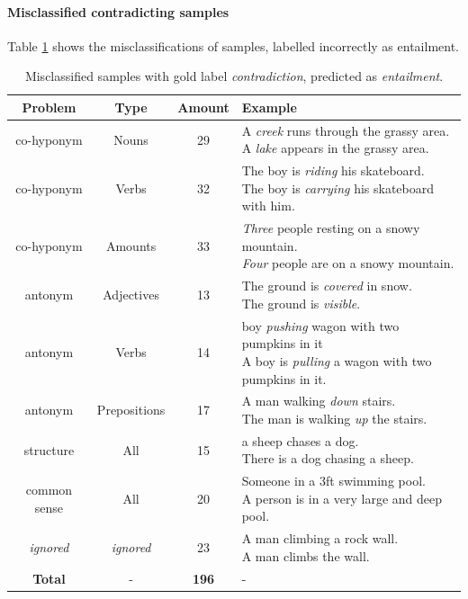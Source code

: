 \paragraph*{Misclassified contradicting samples}
Table \ref{tab:misclassified_orig_contr} shows the misclassifications of samples, labelled incorrectly as entailment.
\begin{table}[tph!]
\centering
\begin{tabular}{cccl}
\textbf{Problem} & \textbf{Type} & \textbf{Amount} & \textbf{Example} \\
\toprule
co-hyponym & Nouns & 29 & \specialcell{A \textit{creek} runs through the grassy area.\\A \textit{lake} appears in the grassy area.}\\
co-hyponym & Verbs & 32 & \specialcell{The boy is \textit{riding} his skateboard.\\The boy is \textit{carrying} his skateboard with him.}\\
co-hyponym & Amounts & 33 & \specialcell{\textit{Three} people resting on a snowy mountain.\\\textit{Four} people are on a snowy mountain.}\\
antonym & Adjectives & 13 & \specialcell{The ground is \textit{covered} in snow.\\The ground is \textit{visible}.}\\
antonym & Verbs & 14 & \specialcell{boy \textit{pushing} wagon with two pumpkins in it\\A boy is \textit{pulling} a wagon with two pumpkins in it.}\\
antonym & Prepositions & 17 & \specialcell{A man walking \textit{down} stairs.\\The man is walking \textit{up} the stairs.}\\
\midrule
structure & All & 15 & \specialcell{a sheep chases a dog.\\There is a dog chasing a sheep.}\\
common sense & All & 20 & \specialcell{Someone in a 3ft swimming pool.\\A person is in a very large and deep pool.}\\
\midrule
\textit{ignored} & \textit{ignored} & 23 & \specialcell{A man climbing a rock wall.\\A man climbs the wall.}\\
\midrule
\textbf{Total} & - & \textbf{196} & - \\
\bottomrule      
\end{tabular}
\caption{Misclassified samples with gold label \textit{contradiction}, predicted as \textit{entailment}.}
\label{tab:misclassified_orig_contr}
\end{table}

